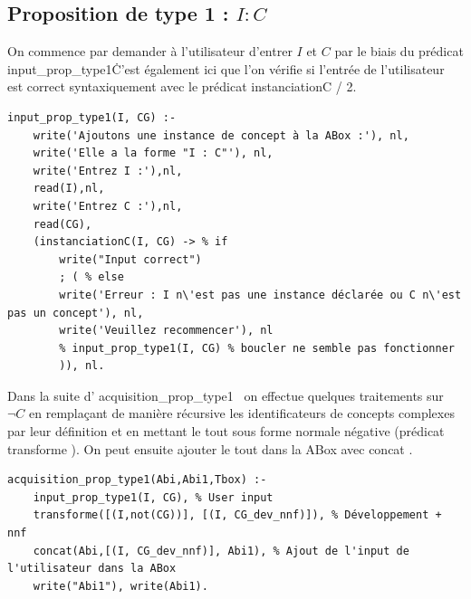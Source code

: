 \documentclass{article}
\begin{document}
\subsection{Proposition de type 1 : $ I : C $ }
On commence par demander à l'utilisateur d'entrer $ I $ et $ C $ par le biais du prédicat \color{blue}input\_prop\_type1\color{black}\. C'est également ici que l'on vérifie si l'entrée de l'utilisateur est correct syntaxiquement avec le prédicat \color{blue}instanciationC / 2\color{black}.
\begin{verbatim}
input_prop_type1(I, CG) :-
    write('Ajoutons une instance de concept à la ABox :'), nl,
    write('Elle a la forme "I : C"'), nl,
    write('Entrez I :'),nl, 
    read(I),nl,
    write('Entrez C :'),nl, 
    read(CG),
    (instanciationC(I, CG) -> % if 
        write("Input correct")
        ; ( % else
        write('Erreur : I n\'est pas une instance déclarée ou C n\'est pas un concept'), nl,
        write('Veuillez recommencer'), nl
        % input_prop_type1(I, CG) % boucler ne semble pas fonctionner 
        )), nl.
\end{verbatim}
Dans la suite d'\color{blue} acquisition\_prop\_type1 \color{black}\ on effectue quelques traitements sur $ \neg C $ en remplaçant de manière récursive les identificateurs de concepts complexes par leur définition et en mettant le tout sous forme normale négative (prédicat \color{blue} transforme \color{black}). On peut ensuite ajouter le tout dans la ABox avec \color{blue} concat \color{black}.
\begin{verbatim}
acquisition_prop_type1(Abi,Abi1,Tbox) :- 
    input_prop_type1(I, CG), % User input
    transforme([(I,not(CG))], [(I, CG_dev_nnf)]), % Développement + nnf
    concat(Abi,[(I, CG_dev_nnf)], Abi1), % Ajout de l'input de l'utilisateur dans la ABox
    write("Abi1"), write(Abi1). 
\end{verbatim}
\end{document}
